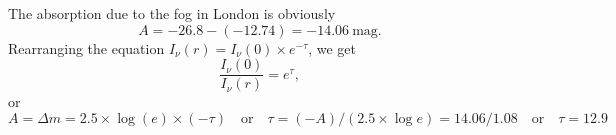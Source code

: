 The absorption due to the fog in London is obviously
\[
A = -26.8 - (-12.74) = -14.06~\text{mag}. \tag*{(2 Point)}
\]
Rearranging the equation $I_\nu(r) = I_\nu(0) \times e^{-\tau}$, we get
\[
\frac{I_\nu(0)}{I_\nu(r)} = e^{\tau}, \tag*{(5 Points)}
\]
or
\[
A = \Delta m = 2.5 \times \log(e) \times (-\tau)
\quad\text{or}\quad
\tau = (-A)/(2.5 \times \log e) = 14.06/1.08
\quad\text{or}\quad %
\tau = 12.9 \tag*{(3 Points)}
\]

